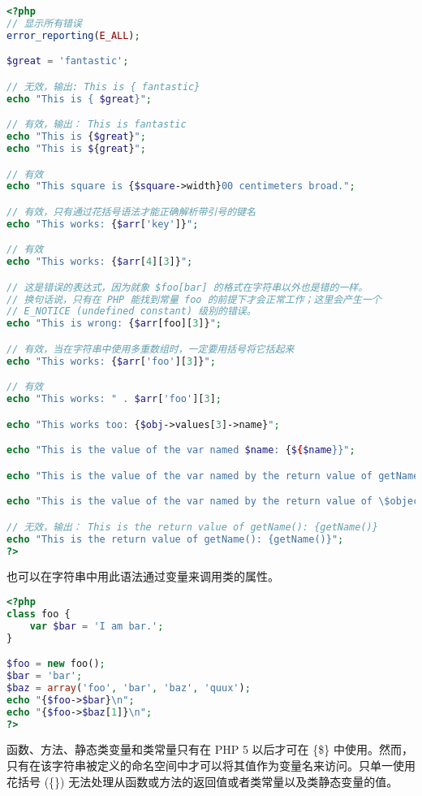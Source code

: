 \begin{compactitem}
\begin{lstlisting}[language=PHP]
<?php
// 显示所有错误
error_reporting(E_ALL);

$great = 'fantastic';

// 无效，输出: This is { fantastic}
echo "This is { $great}";

// 有效，输出： This is fantastic
echo "This is {$great}";
echo "This is ${great}";

// 有效
echo "This square is {$square->width}00 centimeters broad."; 

// 有效，只有通过花括号语法才能正确解析带引号的键名
echo "This works: {$arr['key']}";

// 有效
echo "This works: {$arr[4][3]}";

// 这是错误的表达式，因为就象 $foo[bar] 的格式在字符串以外也是错的一样。
// 换句话说，只有在 PHP 能找到常量 foo 的前提下才会正常工作；这里会产生一个
// E_NOTICE (undefined constant) 级别的错误。
echo "This is wrong: {$arr[foo][3]}"; 

// 有效，当在字符串中使用多重数组时，一定要用括号将它括起来
echo "This works: {$arr['foo'][3]}";

// 有效
echo "This works: " . $arr['foo'][3];

echo "This works too: {$obj->values[3]->name}";

echo "This is the value of the var named $name: {${$name}}";

echo "This is the value of the var named by the return value of getName(): {${getName()}}";

echo "This is the value of the var named by the return value of \$object->getName(): {${$object->getName()}}";

// 无效，输出： This is the return value of getName(): {getName()}
echo "This is the return value of getName(): {getName()}";
?>
\end{lstlisting}

也可以在字符串中用此语法通过变量来调用类的属性。

\begin{lstlisting}[language=PHP]
<?php
class foo {
    var $bar = 'I am bar.';
}

$foo = new foo();
$bar = 'bar';
$baz = array('foo', 'bar', 'baz', 'quux');
echo "{$foo->$bar}\n";
echo "{$foo->$baz[1]}\n";
?>
\end{lstlisting}

函数、方法、静态类变量和类常量只有在 PHP 5 以后才可在 \{\$\} 中使用。然而，只有在该字符串被定义的命名空间中才可以将其值作为变量名来访问。只单一使用花括号 (\{\}) 无法处理从函数或方法的返回值或者类常量以及类静态变量的值。


\end{compactitem}
